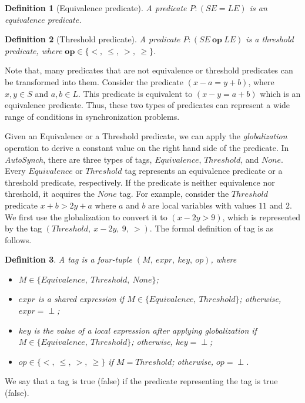 \documentclass{sigplanconf}
\newtheorem{definition}{Definition}
\begin{document}
\begin{definition}[Equivalence predicate]
    A predicate $P: (SE = LE)$ is an equivalence predicate.
\end{definition}
\begin{definition}[Threshold predicate]
   A predicate $P: (SE\ \boldsymbol{op}\ LE)$ is a threshold predicate, where 
   $\boldsymbol{op}
    \in \{<,\ \le,\ >,\ \ge\}$.
    \end{definition}
Note that, many predicates that are not equivalence or threshold predicates can 
be transformed into them. Consider the predicate $(x - a = y + b)$, where 
$x, y \in S$ and $a,b \in L$. This predicate is equivalent to 
$(x - y = a + b)$ which is an equivalence predicate. Thus, these two types of 
predicates can represent a wide range of conditions in synchronization problems. 

Given an Equivalence or a Threshold predicate, we can apply the {\em globalization} operation 
to derive a constant value on the right hand side of the predicate. 
%
In {\em AutoSynch}, there are three types of tags, $Equivalence$, $Threshold$, and 
$None$. Every $Equivalence$ or $Threshold$ tag represents an equivalence predicate 
or a threshold predicate, respectively. 
If the predicate is neither equivalence nor threshold, it acquires the $None$
tag. For example, consider the $Threshold$ predicate $x + b > 2y + a$ where $a$ 
and $b$ are local variables with values $11$ and $2$.
We first use the globalization to convert it to $(x - 2y > 9)$, which is
represented by the tag $(Threshold,\ x - 2y,\ 9,\ >)$. The formal definition of
tag is as follows. 
\begin{definition}
   A tag is a four-tuple $(M,\ expr,\ key,\ op)$, where  
   \begin{itemize}
      \item $M \in \{Equivalence,\ Threshold,\ None\}$;
      \item $expr$ is a shared expression if 
          $M \in \{Equivalence,\ Threshold\}$; otherwise, $expr= \perp$;
      \item $key$ is the value of a local expression after applying
          globalization if $M \in \{Equivalence,\ Threshold\}$; otherwise, 
          $key= \perp$;
      \item $op \in \{<,\ \le,\ >,\ \ge\}$ if $M = Threshold$; otherwise, 
         $op = \perp$.
   \end{itemize}
\end{definition}
We say that a tag is true (false) if the predicate representing the tag is 
true (false).
 
\end{document}
